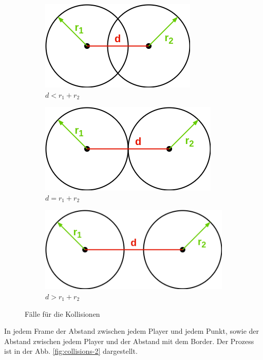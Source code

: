 \documentclass[doktyp=studarbeit]{TUBAFarbeiten}
\begin{document}
\begin{figure}[!htb]
    \centering
    \begin{subfigure}[b]{0.45\textwidth}
        \centering
        \includegraphics[height=0.1\textheight]{collisions-3.png}
        \caption{$d < r_{1} + r_{2}$}
    \end{subfigure}
    \qquad
    \begin{subfigure}[b]{0.45\textwidth}
        \centering
        \includegraphics[height=0.1\textheight]{collisions-4.png}
        \caption{$d = r_{1} + r_{2}$}
    \end{subfigure}
    \qquad
    \begin{subfigure}[b]{0.45\textwidth}
        \centering
        \includegraphics[height=0.1\textheight]{collisions-5.png}
        \caption{$d > r_{1} + r_{2}$}
    \end{subfigure}
    \caption{Fälle für die Kollisionen}
    \label{fig:collisions-1}
\end{figure}

\FloatBarrier
In jedem Frame der Abstand zwischen jedem Player und jedem Punkt,
sowie der Abstand zwischen jedem Player und der Abstand mit dem Border. 
Der Prozess ist in der Abb. \ref{fig:collisions-2} dargestellt.
\end{document}
